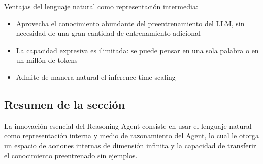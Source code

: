 Ventajas del lenguaje natural como representación intermedia:
\begin{itemize}
    \item Aprovecha el conocimiento abundante del preentrenamiento del LLM, sin necesidad de una gran cantidad de entrenamiento adicional
    \item La capacidad expresiva es ilimitada: se puede pensar en una sola palabra o en un millón de tokens
    \item Admite de manera natural el inference-time scaling
\end{itemize}

\subsection{Resumen de la sección}

La innovación esencial del Reasoning Agent consiste en usar el lenguaje natural como representación interna y medio de razonamiento del Agent, lo cual le otorga un espacio de acciones internas de dimensión infinita y la capacidad de transferir el conocimiento preentrenado sin ejemplos.

